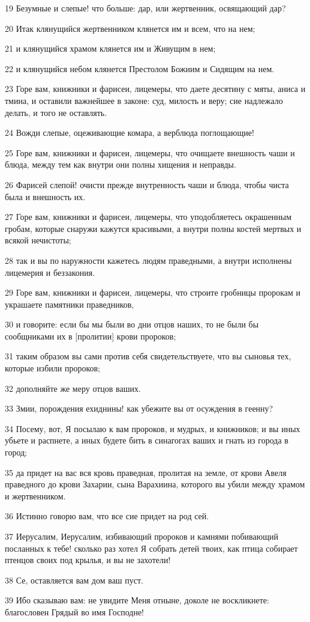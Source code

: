 \par 19 Безумные и слепые! что больше: дар, или жертвенник, освящающий дар?
\par 20 Итак клянущийся жертвенником клянется им и всем, что на нем;
\par 21 и клянущийся храмом клянется им и Живущим в нем;
\par 22 и клянущийся небом клянется Престолом Божиим и Сидящим на нем.
\par 23 Горе вам, книжники и фарисеи, лицемеры, что даете десятину с мяты, аниса и тмина, и оставили важнейшее в законе: суд, милость и веру; сие надлежало делать, и того не оставлять.
\par 24 Вожди слепые, оцеживающие комара, а верблюда поглощающие!
\par 25 Горе вам, книжники и фарисеи, лицемеры, что очищаете внешность чаши и блюда, между тем как внутри они полны хищения и неправды.
\par 26 Фарисей слепой! очисти прежде внутренность чаши и блюда, чтобы чиста была и внешность их.
\par 27 Горе вам, книжники и фарисеи, лицемеры, что уподобляетесь окрашенным гробам, которые снаружи кажутся красивыми, а внутри полны костей мертвых и всякой нечистоты;
\par 28 так и вы по наружности кажетесь людям праведными, а внутри исполнены лицемерия и беззакония.
\par 29 Горе вам, книжники и фарисеи, лицемеры, что строите гробницы пророкам и украшаете памятники праведников,
\par 30 и говорите: если бы мы были во дни отцов наших, то не были бы сообщниками их в [пролитии] крови пророков;
\par 31 таким образом вы сами против себя свидетельствуете, что вы сыновья тех, которые избили пророков;
\par 32 дополняйте же меру отцов ваших.
\par 33 Змии, порождения ехиднины! как убежите вы от осуждения в геенну?
\par 34 Посему, вот, Я посылаю к вам пророков, и мудрых, и книжников; и вы иных убьете и распнете, а иных будете бить в синагогах ваших и гнать из города в город;
\par 35 да придет на вас вся кровь праведная, пролитая на земле, от крови Авеля праведного до крови Захарии, сына Варахиина, которого вы убили между храмом и жертвенником.
\par 36 Истинно говорю вам, что все сие придет на род сей.
\par 37 Иерусалим, Иерусалим, избивающий пророков и камнями побивающий посланных к тебе! сколько раз хотел Я собрать детей твоих, как птица собирает птенцов своих под крылья, и вы не захотели!
\par 38 Се, оставляется вам дом ваш пуст.
\par 39 Ибо сказываю вам: не увидите Меня отныне, доколе не воскликнете: благословен Грядый во имя Господне!

